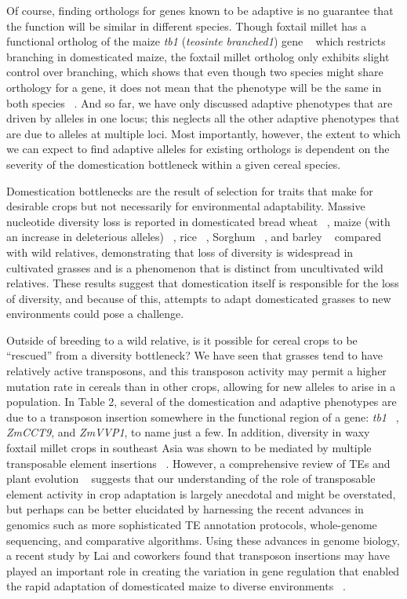 \documentclass[12pt]{article}
\begin{document}
Of course, finding orthologs for genes known to be adaptive is no guarantee that the function will be similar in different species. Though foxtail millet has a functional ortholog of the maize \textit{tb1} (\textit{teosinte branched1}) gene ~\cite{pmid9087405}  which restricts branching in domesticated maize, the foxtail millet ortholog only exhibits slight control over branching, which shows that even though two species might share orthology for a gene, it does not mean that the phenotype will be the same in both species ~\cite{Doust2004}. And so far, we have only discussed adaptive phenotypes that are driven by alleles in one locus; this neglects all the other adaptive phenotypes that are due to alleles at multiple loci.  Most importantly, however, the extent to which we can expect to find adaptive alleles for existing orthologs is dependent on the severity of the domestication bottleneck within a given cereal species.

Domestication bottlenecks are the result of selection for traits that make for desirable crops but not necessarily for environmental adaptability. Massive nucleotide diversity loss is reported in domesticated bread wheat ~\cite{Haudry2007}, maize (with an increase in deleterious alleles) ~\cite{pmid9539756, Wang2017}, rice ~\cite{pmid17218640}, Sorghum ~\cite{Hamblin2006}, and barley ~\cite{Kilian2006} compared with wild relatives, demonstrating that loss of diversity is widespread in cultivated grasses and is a phenomenon that is distinct from uncultivated wild relatives. These results suggest that domestication itself is responsible for the loss of diversity, and because of this, attempts to adapt domesticated grasses to new environments could pose a challenge.  

Outside of breeding to a wild relative, is it possible for cereal crops to be “rescued” from a diversity bottleneck? We have seen that grasses tend to have relatively active transposons, and this transposon activity may permit a higher mutation rate in cereals than in other crops, allowing for new alleles to arise in a population.  In Table 2, several of the domestication and adaptive phenotypes are due to a transposon insertion somewhere in the functional region of a gene: \textit{tb1} ~\cite{Studer2011}, \textit{ZmCCT9}, and \textit{ZmVVP1}, to name just a few. In addition, diversity in waxy foxtail millet crops in southeast Asia was shown to be mediated by multiple transposable element insertions ~\cite{Kawase2005}. However, a comprehensive review of TEs and plant evolution ~\cite{Lisch2001} suggests that our understanding of the role of transposable element activity in crop adaptation is largely anecdotal and might be overstated, but perhaps can be better elucidated by harnessing the recent advances in genomics such as more sophisticated TE annotation protocols, whole-genome sequencing, and comparative algorithms.  Using these advances in genome biology, a recent study by Lai and coworkers found that transposon insertions may have played an important role in creating the variation in gene regulation that enabled the rapid adaptation of domesticated maize to diverse environments ~\cite{Lai2017}. 
\end{document}
